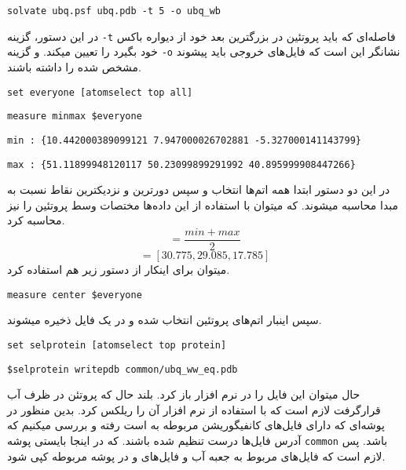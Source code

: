 \begin{latin}
\verb|solvate ubq.psf ubq.pdb -t 5 -o ubq_wb|\\
\end{latin}
در این دستور، گزینه \verb*|-t| فاصله‌ای که باید پروتئین در بزرگترین بعد خود از دیواره باکس خود بگیرد را تعیین میکند. و گزینه \verb*|-o| نشانگر این است که فایل‌‌های خروجی باید پیشوند مشخص شده را داشته باشند.\\
\begin{latin}
\verb|set everyone [atomselect top all]|
\end{latin}
\begin{latin}
	\verb|measure minmax $everyone|
\end{latin}
\begin{latin}
	\verb|min : {10.442000389099121 7.947000026702881 -5.327000141143799}|
	
	\verb|max : {51.11899948120117 50.23099899291992 40.895999908447266}|\\
\end{latin}
در این دو دستور ابتدا همه اتم‌ها انتخاب و سپس دورترین و نزدیکترین نقاط نسبت به مبدا محاسبه میشوند. که میتوان با استفاده از این داده‌ها مختصات وسط پروتئین را نیز محاسبه کرد.
\begin{equation}
	[x_c, y_c, z_c] = \frac{min + max}{2}
\end{equation}
\begin{equation}
	[x_c, y_c, z_c] = [30.775, 29.085, 17.785]
\end{equation}
میتوان برای اینکار از دستور زیر هم استفاده کرد.
\begin{latin}
	\verb|measure center $everyone|
\end{latin}
سپس اینبار اتم‌‌های پروتئین انتخاب شده و در یک فایل  ذخیره میشوند.
\begin{latin}
	\verb|set selprotein [atomselect top protein]|
	
	\verb|$selprotein writepdb common/ubq_ww_eq.pdb|
\end{latin}
حال میتوان این فایل را در نرم افزار  باز کرد.
‌بلند
حال که پروتئن در ظرف آب قرارگرفت لازم است که با استفاده از نرم افزار  آن را ریلکس کرد. بدین منظور در پوشه‌ای که دارای فایل‌‌های کانفیگوریشن مربوطه به  است رفته و بررسی میکنیم که آدرس فایل‌ها درست تنظیم شده باشند. که در اینجا بایستی پوشه \verb*|common| باشد. پس لازم است که فایل‌‌های مربوط به جعبه آب و فایل‌‌های  و  در پوشه مربوطه کپی شود.

